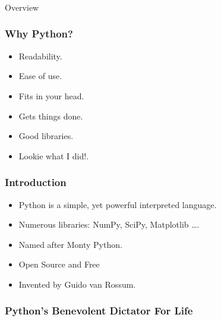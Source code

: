 \begin{frame}[fragile]\frametitle{}
\begin{center}
{\Large Overview}
\end{center}
\end{frame}

\begin{frame} \frametitle{Why Python?}
\begin{itemize}
\item  Readability.
\item Ease of use.
\item Fits in your head.
\item Gets things done.
\item Good libraries.
\item Lookie what I did!.
\end{itemize}
\end{frame}


\begin{frame}[fragile]  \frametitle{Introduction}
\begin{itemize}
\item Python is a simple, yet powerful interpreted language.
\item  Numerous libraries: NumPy, SciPy, Matplotlib \ldots.
\item Named after Monty Python.
\item Open Source and Free
\item Invented by Guido van Rossum.
\end{itemize}
\end{frame}

\begin{frame}[fragile]\frametitle{Python's Benevolent Dictator For Life}

\hfill
{}
\end{frame}



